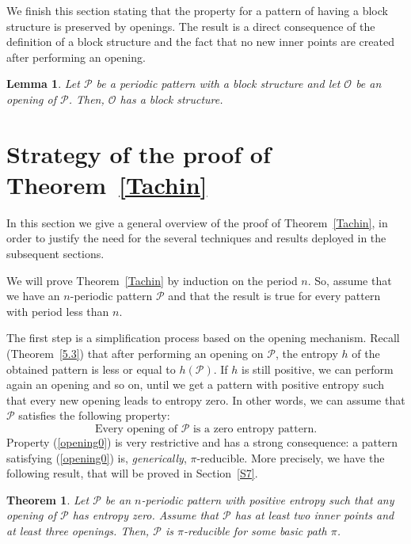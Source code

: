 \documentclass[a4paper]{amsart}
\newtheorem{MainTheorem}{Theorem}
\newtheorem{lemma}[theorem]{Lemma}
\theoremstyle{definition}
\begin{document}
We finish this section stating that the property for a pattern of having a block structure is preserved by openings.
The result is a direct consequence of the definition of a block structure and the fact that no new inner points are created
after performing an opening.

\begin{lemma}\label{openingblock}
Let $\mathcal{P}$ be a periodic pattern with a block structure and let $\mathcal{O}$ be an opening of $\mathcal{P}$. Then,
$\mathcal{O}$ has a block structure.
\end{lemma}

\section{Strategy of the proof of Theorem~\ref{Tachin}}\label{S5}
In this section we give a general overview of the proof of Theorem~\ref{Tachin}, in order
to justify the need for the several techniques and results deployed in the subsequent sections.

We will prove Theorem~\ref{Tachin} by induction on the period $n$. So, assume that we have
an $n$-periodic pattern $\mathcal{P}$ and that the result is true for every pattern with period less than $n$.

The first step is a simplification process based on the opening mechanism. Recall (Theorem~\ref{5.3}) that
after performing an opening on $\mathcal{P}$, the entropy $h$ of the obtained pattern is less or equal to
$h(\mathcal{P})$. If $h$ is still positive, we can perform again an opening and so on, until we get
a pattern with positive entropy such that every new opening leads to entropy zero. In other words,
we can assume that $\mathcal{P}$ satisfies the following property:
\begin{equation}\label{opening0}
\mbox{Every opening of $\mathcal{P}$ is a zero entropy pattern}.\tag{$\star$}
\end{equation}\label{pagina}
Property (\ref{opening0}) is very restrictive and has a strong consequence: a pattern
satisfying (\ref{opening0}) is, \emph{generically}, $\pi$-reducible. More precisely,
we have the following result, that will be proved in Section~\ref{S7}.

\begin{MainTheorem}\label{2inners_3op}
Let $\mathcal{P}$ be an $n$-periodic pattern with positive entropy such that any opening of $\mathcal{P}$ has entropy zero.
Assume that $\mathcal{P}$ has at least two inner points and at least three openings. Then, $\mathcal{P}$ is $\pi$-reducible
for some basic path $\pi$.
\end{MainTheorem}
\end{document}
